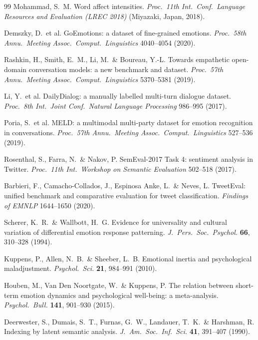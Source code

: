 \documentclass[fleqn,10pt]{wlscirep}
\begin{document}
\begin{thebibliography}{99}
Mohammad, S.\ M.
Word affect intensities.
\emph{Proc.\ 11th Int.\ Conf.\ Language Resources and Evaluation (LREC 2018)}
(Miyazaki, Japan, 2018).

Demszky, D.\ et al.
GoEmotions: a dataset of fine-grained emotions.
\emph{Proc.\ 58th Annu.\ Meeting Assoc.\ Comput.\ Linguistics} 4040--4054 (2020).

Rashkin, H., Smith, E.\ M., Li, M.\ \& Boureau, Y.-L.
Towards empathetic open-domain conversation models: a new benchmark and dataset.
\emph{Proc.\ 57th Annu.\ Meeting Assoc.\ Comput.\ Linguistics} 5370--5381 (2019).

Li, Y.\ et al.
DailyDialog: a manually labelled multi-turn dialogue dataset.
\emph{Proc.\ 8th Int.\ Joint Conf.\ Natural Language Processing} 986--995 (2017).

Poria, S.\ et al.
MELD: a multimodal multi-party dataset for emotion recognition in conversations.
\emph{Proc.\ 57th Annu.\ Meeting Assoc.\ Comput.\ Linguistics} 527--536 (2019).

Rosenthal, S., Farra, N.\ \& Nakov, P.
SemEval-2017 Task 4: sentiment analysis in Twitter.
\emph{Proc.\ 11th Int.\ Workshop on Semantic Evaluation} 502--518 (2017).

Barbieri, F., Camacho-Collados, J., Espinosa Anke, L.\ \& Neves, L.
TweetEval: unified benchmark and comparative evaluation for tweet classification.
\emph{Findings of EMNLP} 1644--1650 (2020).

Scherer, K.\ R.\ \& Wallbott, H.\ G.
Evidence for universality and cultural variation of differential emotion response patterning.
\emph{J.\ Pers.\ Soc.\ Psychol.} \textbf{66}, 310--328 (1994).

Kuppens, P., Allen, N.\ B.\ \& Sheeber, L.\ B.
Emotional inertia and psychological maladjustment.
\emph{Psychol.\ Sci.} \textbf{21}, 984--991 (2010).

Houben, M., Van Den Noortgate, W.\ \& Kuppens, P.
The relation between short-term emotion dynamics and psychological well-being: a meta-analysis.
\emph{Psychol.\ Bull.} \textbf{141}, 901--930 (2015).

Deerwester, S., Dumais, S.\ T., Furnas, G.\ W., Landauer, T.\ K.\ \& Harshman, R.
Indexing by latent semantic analysis.
\emph{J.\ Am.\ Soc.\ Inf.\ Sci.} \textbf{41}, 391--407 (1990).


\end{thebibliography}
\end{document}
